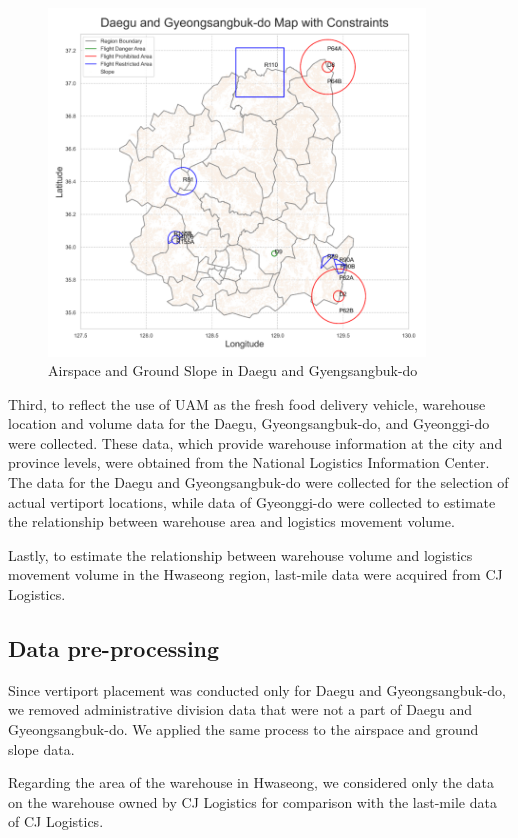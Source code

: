 \documentclass[11pt]{article}
\begin{document}
    \begin{figure}[H]
        \centering
        \includegraphics[width = 10cm]{./figure/airspace_and_groundslope.png}
        \caption{Airspace and Ground Slope in Daegu and Gyengsangbuk-do}
        \label{fig:enter-label}
    \end{figure}
    
    Third, to reflect the use of UAM as the fresh food delivery vehicle, warehouse location and volume data for the Daegu, Gyeongsangbuk-do, and Gyeonggi-do were collected. These data, which provide warehouse information at the city and province levels, were obtained from the National Logistics Information Center. The data for the Daegu and Gyeongsangbuk-do were collected for the selection of actual vertiport locations, while data of Gyeonggi-do were collected to estimate the relationship between warehouse area and logistics movement volume.
    
    Lastly, to estimate the relationship between warehouse volume and logistics movement volume in the Hwaseong region, last-mile data were acquired from CJ Logistics.


    \subsection{Data pre-processing}
    Since vertiport placement was conducted only for Daegu and Gyeongsangbuk-do, we removed administrative division data that were not a part of Daegu and Gyeongsangbuk-do. We applied the same process to the airspace and ground slope data.
    
    Regarding the area of the warehouse in Hwaseong, we considered only the data on the warehouse owned by CJ Logistics for comparison with the last-mile data of CJ Logistics.
\end{document}
